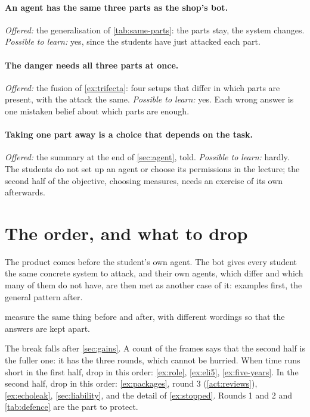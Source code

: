 \SecLOAgents*

\paragraph{An agent has the same three parts as the shop's bot.}
\emph{Offered:} the generalisation of \cref{tab:same-parts}: the
parts stay, the system changes.
\emph{Possible to learn:} yes, since the students have just
attacked each part.
\paragraph{The danger needs all three parts at once.}
\emph{Offered:} the fusion of \cref{ex:trifecta}: four setups that
differ in which parts are present, with the attack the same.
\emph{Possible to learn:} yes.
Each wrong answer is one mistaken belief about which parts are
enough.
\paragraph{Taking one part away is a choice that depends on the task.}
\emph{Offered:} the summary at the end of \cref{sec:agent}, told.
\emph{Possible to learn:} hardly.
The students do not set up an agent or choose its permissions in
the lecture; the second half of the objective, choosing measures,
needs an exercise of its own afterwards.


\section{The order, and what to drop}
\label{sec:design-order}

The product comes before the student's own agent.
The bot gives every student the same concrete system to attack, and
their own agents, which differ and which many of them do not have, are
then met as another case of it: examples first, the general pattern
after.

 measure the same thing before and after,
with different wordings so that the answers are kept apart.

The break falls after \cref{sec:gains}.
A count of the frames says that the second half is the fuller one: it
has the three rounds, which cannot be hurried.
When time runs short in the first half, drop in this order:
\cref{ex:role}, \cref{ex:eli5}, \cref{ex:five-years}.
In the second half, drop in this order: \cref{ex:packages}, round 3
(\cref{act:reviews}), \cref{ex:echoleak}, \cref{sec:liability}, and
the detail of \cref{ex:stopped}.
Rounds 1 and 2 and \cref{tab:defence} are the part to protect.
